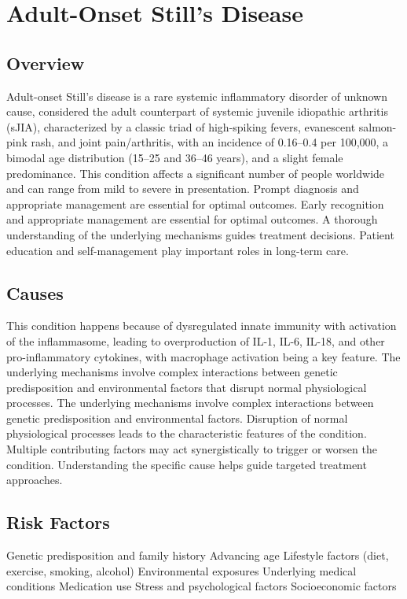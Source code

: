 \chapter{Adult-Onset Still's Disease}
\label{sec:Adult-Onset Still's Disease (AOSD)}

\section{Overview}
Adult-onset Still's disease is a rare systemic inflammatory disorder of unknown cause, considered the adult counterpart of systemic juvenile idiopathic arthritis (sJIA), characterized by a classic triad of high-spiking fevers, evanescent salmon-pink rash, and joint pain/arthritis, with an incidence of 0.16--0.4 per 100,000, a bimodal age distribution (15--25 and 36--46 years), and a slight female predominance. This condition affects a significant number of people worldwide and can range from mild to severe in presentation. Prompt diagnosis and appropriate management are essential for optimal outcomes. Early recognition and appropriate management are essential for optimal outcomes. A thorough understanding of the underlying mechanisms guides treatment decisions. Patient education and self-management play important roles in long-term care.
\section{Causes}
This condition happens because of dysregulated innate immunity with activation of the inflammasome, leading to overproduction of IL-1, IL-6, IL-18, and other pro-inflammatory cytokines, with macrophage activation being a key feature. The underlying mechanisms involve complex interactions between genetic predisposition and environmental factors that disrupt normal physiological processes. The underlying mechanisms involve complex interactions between genetic predisposition and environmental factors. Disruption of normal physiological processes leads to the characteristic features of the condition. Multiple contributing factors may act synergistically to trigger or worsen the condition. Understanding the specific cause helps guide targeted treatment approaches.
\section{Risk Factors}
Genetic predisposition and family history Advancing age Lifestyle factors (diet, exercise, smoking, alcohol) Environmental exposures Underlying medical conditions Medication use Stress and psychological factors Socioeconomic factors

